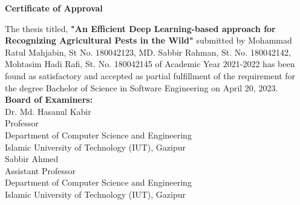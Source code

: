 \begin{center}
\Large \textbf{Certificate of Approval}
\end{center}
\normalsize
The thesis titled, \textbf{"An Efficient Deep Learning-based approach for Recognizing Agricultural Pests in the Wild"} submitted by Mohammad Ratul Mahjabin, St No. 180042123, MD. Sabbir Rahman, St. No. 180042142, Mohtasim Hadi Rafi, St. No. 180042145 of Academic Year 2021-2022 has been found as satisfactory and accepted as partial fulfillment of the requirement for the degree Bachelor of Science in Software Engineering on April 20, 2023.\\[1cm]
\textbf{Board of Examiners:}\\[2cm]
\normalsize
Dr. Md. Hasanul Kabir\\
\footnotesize
Professor\\
Department of Computer Science and Engineering\\
Islamic University of Technology (IUT), Gazipur\\[2cm]
\normalsize
Sabbir Ahmed\\
\footnotesize
Assistant Professor\\
Department of Computer Science and Engineering\\
Islamic University of Technology (IUT), Gazipur\\[2cm]
